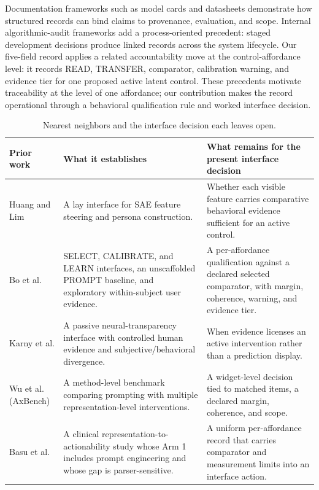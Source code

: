 \documentclass[manuscript,review,anonymous]{acmart}
\newcommand{\TopRule}{\toprule}
\begin{document}
Documentation frameworks such as model cards and datasheets demonstrate how structured records can bind claims to provenance, evaluation, and scope. \cite{mitchell2019modelcards,gebru2021datasheets} Internal algorithmic-audit frameworks add a process-oriented precedent: staged development decisions produce linked records across the system lifecycle. \cite{raji2020accountability} {}%
Our five-field record applies a related accountability move at the control-affordance level: it records READ, TRANSFER, comparator, calibration warning, and evidence tier for one proposed active latent control. These precedents motivate traceability at the level of one affordance; our contribution makes the record operational through a behavioral qualification rule and worked interface decision.

\begin{table}[t]
\centering
\footnotesize
\setlength{\tabcolsep}{4pt}
\caption{Nearest neighbors and the interface decision each leaves open.}
\label{tab:novelty-neighbors}
\begin{tabular}{@{}p{}p{}p{}@{}}
\TopRule
Prior work & What it establishes & What remains for the present interface decision \\
\midrule
Huang and Lim \cite{huang2025steering} & A lay interface for SAE feature steering and persona construction. & Whether each visible feature carries comparative behavioral evidence sufficient for an active control. \\
Bo et al. \cite{bo2026steerable} & SELECT, CALIBRATE, and LEARN interfaces, an unscaffolded PROMPT baseline, and exploratory within-subject user evidence. & A per-affordance qualification against a declared selected comparator, with margin, coherence, warning, and evidence tier. \\
Karny et al. \cite{karny2026neural} & A passive neural-transparency interface with controlled human evidence and subjective/behavioral divergence. & When evidence licenses an active intervention rather than a prediction display. \\
Wu et al. (AxBench) \cite{wu2025axbench} & A method-level benchmark comparing prompting with multiple representation-level interventions. & A widget-level decision tied to matched items, a declared margin, coherence, and scope. \\
Basu et al. \cite{basu2026actionability} & A clinical representation-to-actionability study whose Arm 1 includes prompt engineering and whose gap is parser-sensitive. & A uniform per-affordance record that carries comparator and measurement limits into an interface action. \\

\end{tabular}
\end{table}
\end{document}
